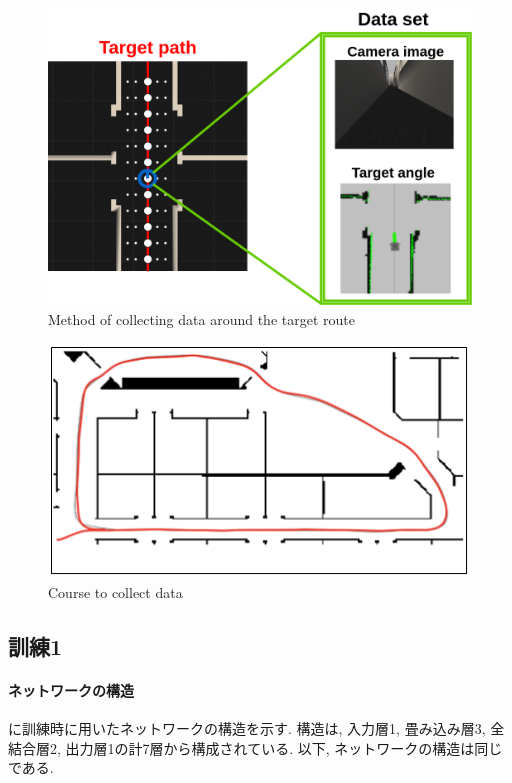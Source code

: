 \newpage
  \begin{figure}[h]
  \centering
  \includegraphics[keepaspectratio, scale=0.25]{images/collect-data2.png}
  \caption{Method of collecting data around the target route}
  \label{Fig:collect-data2}
  \end{figure}

\vspace{15mm}

\begin{figure}[h]
  \centering
  \includegraphics[keepaspectratio, scale=0.5]{images/willow-garage.png}
  \caption{Course to collect data}
  \label{Fig:willow-garage}
  \end{figure}

\newpage
\subsection{訓練1}
\paragraph{ネットワークの構造}
に訓練時に用いたネットワークの構造を示す. 構造は, 入力層1, 畳み込み層3, 全結合層2, 出力層1の計7層から構成されている. 以下, ネットワークの構造は同じである. 

